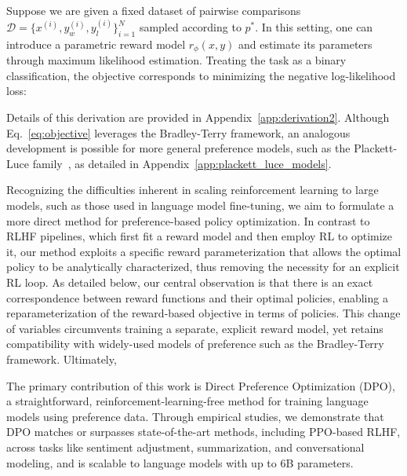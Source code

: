 Suppose we are given a fixed dataset of pairwise comparisons $\mathcal{D}=\bigl\{x^{(i)}, y_w^{(i)}, y_l^{(i)}\bigr\}_{i=1}^N$ sampled according to $p^*$. In this setting, one can introduce a parametric reward model $r_{\phi}(x, y)$ and estimate its parameters through maximum likelihood estimation. Treating the task as a binary classification, the objective corresponds to minimizing the negative log-likelihood loss:

Details of this derivation are provided in Appendix~\ref{app:derivation2}. Although Eq.~\ref{eq:objective} leverages the Bradley-Terry framework, an analogous development is possible for more general preference models, such as the Plackett-Luce family~\citep{plackett1975analysis, luce2012individual}, as detailed in Appendix~\ref{app:plackett_luce_models}.

Recognizing the difficulties inherent in scaling reinforcement learning to large models, such as those used in language model fine-tuning, we aim to formulate a more direct method for preference-based policy optimization. In contrast to RLHF pipelines, which first fit a reward model and then employ RL to optimize it, our method exploits a specific reward parameterization that allows the optimal policy to be analytically characterized, thus removing the necessity for an explicit RL loop. As detailed below, our central observation is that there is an exact correspondence between reward functions and their optimal policies, enabling a reparameterization of the reward-based objective in terms of policies. This change of variables circumvents training a separate, explicit reward model, yet retains compatibility with widely-used models of preference such as the Bradley-Terry framework. Ultimately,

The primary contribution of this work is Direct Preference Optimization (DPO), a straightforward, reinforcement-learning-free method for training language models using preference data. Through empirical studies, we demonstrate that DPO matches or surpasses state-of-the-art methods, including PPO-based RLHF, across tasks like sentiment adjustment, summarization, and conversational modeling, and is scalable to language models with up to 6B parameters.

